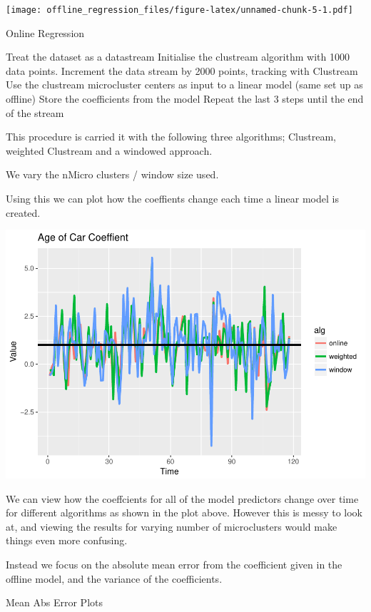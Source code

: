 \texttt{[image: offline\_regression\_files/figure-latex/unnamed-chunk-5-1.pdf]}


Online Regression

  Treat the dataset as a datastream
  Initialise the clustream algorithm with 1000 data points.
  Increment the data stream by 2000 points, tracking with Clustream
  Use the clustream microcluster centers as input to a linear model
  (same set up as offline)
  Store the coefficients from the model
  Repeat the last 3 steps until the end of the stream


This procedure is carried it with the following three algorithms;
Clustream, weighted Clustream and a windowed approach.

We vary the nMicro clusters / window size used.

Using this we can plot how the coeffients change each time a linear
model is created.

\includegraphics{offline_regression_files/figure-latex/unnamed-chunk-6-1.pdf}

We can view how the coeffcients for all of the model predictors change
over time for different algorithms as shown in the plot above. However
this is messy to look at, and viewing the results for varying number of
microclusters would make things even more confusing.

Instead we focus on the absolute mean error from the coefficient given
in the offline model, and the variance of the coefficients.

Mean Abs Error Plots

